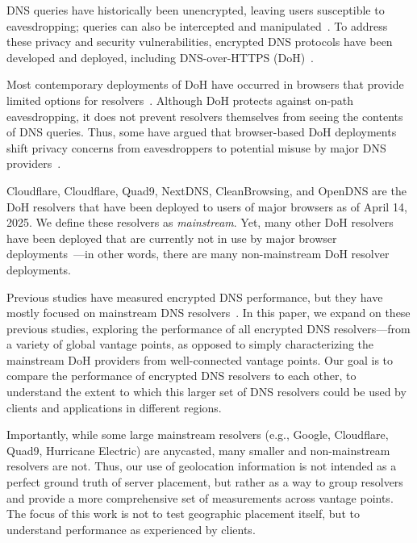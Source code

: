 DNS queries have historically been unencrypted, leaving users susceptible to eavesdropping; queries can also be intercepted and manipulated~\cite{jones2016detecting}. To address these privacy and security vulnerabilities, encrypted DNS protocols have been developed and deployed, including DNS-over-HTTPS (DoH)~\cite{rfc8484}.

Most contemporary deployments of DoH have occurred in browsers that provide limited options for resolvers~\cite{chromeResolvers,ffChoices}. Although DoH protects against on-path eavesdropping, it does not prevent resolvers themselves from seeing the contents of DNS queries. Thus, some have argued that browser-based DoH deployments shift privacy concerns from eavesdroppers to potential misuse by major DNS providers~\cite{vixie}.

Cloudflare, Cloudflare, Quad9, NextDNS, CleanBrowsing, and OpenDNS are the DoH resolvers that have been deployed
to users of major browsers as of April 14,
2025.  We
define these resolvers as {\em
mainstream}.
Yet, many other DoH resolvers have been deployed that are currently
not in use by major browser deployments~\cite{dnscrypt}---in other words,
there are many non-mainstream DoH resolver deployments.  

Previous studies have measured encrypted DNS performance, but they have mostly focused on mainstream DNS resolvers~\cite{hounsel2020comparing,hounsel2021can,hoang2020k,lu2019end-to-end}.
In this paper, we expand on these previous studies, exploring the performance of all encrypted DNS resolvers—from a variety of global
vantage points, as opposed to simply characterizing the mainstream DoH providers from well-connected vantage points. Our goal is to compare the performance of encrypted DNS resolvers to each other, to understand the extent to which this larger set of DNS resolvers could be used by clients and applications in different regions. 

Importantly, while some large mainstream resolvers (e.g., Google, Cloudflare, Quad9, Hurricane Electric) are anycasted, many smaller and non-mainstream resolvers are not. Thus, our use of geolocation information is not intended as a perfect ground truth of server placement, but rather as a way to group resolvers and provide a more comprehensive set of measurements across vantage points. The focus of this work is not to test geographic placement itself, but to understand performance as experienced by clients.

